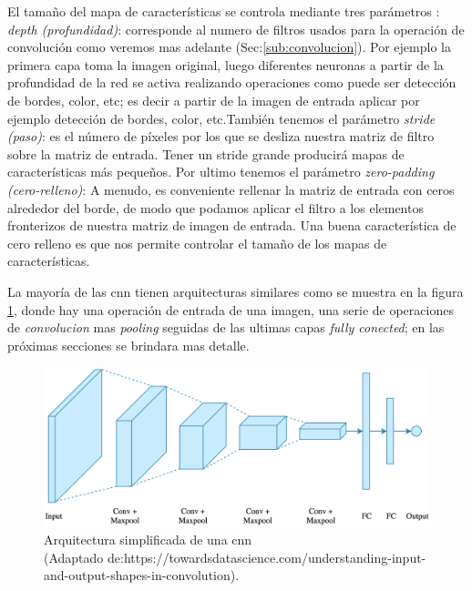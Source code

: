 El tamaño del mapa de características se controla mediante tres parámetros \citep{cnnsarticle}: \textit{depth (profundidad)}: corresponde al numero de filtros usados para la operación de convolución como veremos mas adelante (Sec:\ref{sub:convolucion}). Por ejemplo la primera capa toma la imagen original, luego diferentes neuronas a partir de la profundidad de la red se activa realizando operaciones como puede ser detección de bordes, color, etc; es decir a partir de la imagen de entrada aplicar por ejemplo detección de bordes, color, etc.También tenemos el parámetro \textit{stride (paso)}: es el número de píxeles por los que se desliza nuestra matriz de filtro sobre la matriz de entrada. Tener un stride grande producirá mapas de características más pequeños. Por ultimo tenemos el parámetro \textit{zero-padding (cero-relleno)}: A menudo, es conveniente rellenar la matriz de entrada con ceros alrededor del borde, de modo que podamos aplicar el filtro a los elementos fronterizos de nuestra matriz de imagen de entrada. Una buena característica de cero relleno es que nos permite controlar el tamaño de los mapas de características.

La mayoría de las \ac{cnn} tienen arquitecturas similares como se muestra en la figura \ref{Fig:cnn_network}, donde hay una operación de entrada de una imagen, una serie de operaciones de  \textit{convolucion} mas  \textit{pooling} seguidas de las ultimas capas \textit{fully conected}; en las próximas secciones se brindara mas detalle. 

\begin{figure}[H]
 \centering
  \includegraphics[scale=0.2,keepaspectratio=true,clip=true]{imagenes/MarcoTeorico/cnn_intuition.png}
  \caption{Arquitectura simplificada de una \ac{cnn} \\ (Adaptado de:https://towardsdatascience.com/understanding-input-and-output-shapes-in-convolution).} \label{Fig:cnn_network}
\end{figure}






